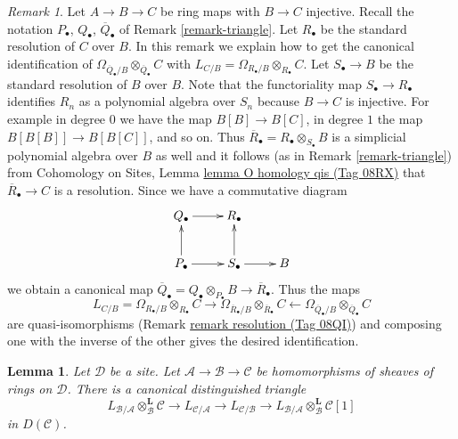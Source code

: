 \documentclass{amsart}
\theoremstyle{plain}
\newtheorem{lemma}[subsection]{Lemma}
\theoremstyle{definition}
\theoremstyle{remark}
\newtheorem{remark}[subsection]{Remark}
\numberwithin{equation}{subsection}
\begin{document}
\begin{remark}
\label{remark-explicit-map}
Let $A \to B \to C$ be ring maps with $B \to C$ injective.
Recall the notation $P_\bullet$, $Q_\bullet$, $\overline{Q}_\bullet$ of
Remark \ref{remark-triangle}.
Let $R_\bullet$ be the standard resolution of $C$ over $B$.
In this remark we explain how to get the canonical identification
of $\Omega_{\overline{Q}_\bullet/B} \otimes_{\overline{Q}_\bullet} C$
with $L_{C/B} = \Omega_{R_\bullet/B} \otimes_{R_\bullet} C$.
Let $S_\bullet \to B$ be the standard resolution of $B$ over $B$.
Note that the functoriality map $S_\bullet \to R_\bullet$ identifies
$R_n$ as a polynomial algebra over $S_n$ because $B \to C$ is injective.
For example in degree $0$ we have the map $B[B] \to B[C]$, in degree
$1$ the map $B[B[B]] \to B[B[C]]$, and so on. Thus
$\overline{R}_\bullet = R_\bullet \otimes_{S_\bullet} B$
is a simplicial polynomial algebra
over $B$ as well and it follows (as in Remark \ref{remark-triangle}) from
Cohomology on Sites, Lemma
\href{https://stacks.math.columbia.edu/tag/08RX}{lemma O homology qis (Tag 08RX)}
that $\overline{R}_\bullet \to C$ is a resolution. Since we have
a commutative diagram
$$
\xymatrix{
Q_\bullet \ar[r] & R_\bullet \\
P_\bullet \ar[u] \ar[r] & S_\bullet \ar[u] \ar[r] & B
}
$$
we obtain a canonical map
$\overline{Q}_\bullet = Q_\bullet \otimes_{P_\bullet} B \to
\overline{R}_\bullet$. Thus the maps
$$
L_{C/B} = \Omega_{R_\bullet/B} \otimes_{R_\bullet} C
\longrightarrow
\Omega_{\overline{R}_\bullet/B} \otimes_{\overline{R}_\bullet} C
\longleftarrow
\Omega_{\overline{Q}_\bullet/B} \otimes_{\overline{Q}_\bullet} C
$$
are quasi-isomorphisms (Remark \href{https://stacks.math.columbia.edu/tag/08QI}{remark resolution (Tag 08QI)}) and composing
one with the inverse of the other gives the desired identification.
\end{remark}

\begin{lemma}
\label{lemma-triangle-sheaves-rings}
Let $\mathcal{D}$ be a site. Let $\mathcal{A} \to \mathcal{B} \to \mathcal{C}$
be homomorphisms of sheaves of rings on $\mathcal{D}$.
There is a canonical distinguished triangle
$$
L_{\mathcal{B}/\mathcal{A}} \otimes_\mathcal{B}^\mathbf{L} \mathcal{C}
\to L_{\mathcal{C}/\mathcal{A}} \to L_{\mathcal{C}/\mathcal{B}} \to
L_{\mathcal{B}/\mathcal{A}} \otimes_\mathcal{B}^\mathbf{L} \mathcal{C}[1]
$$
in $D(\mathcal{C})$.
\end{lemma}
\end{document}
